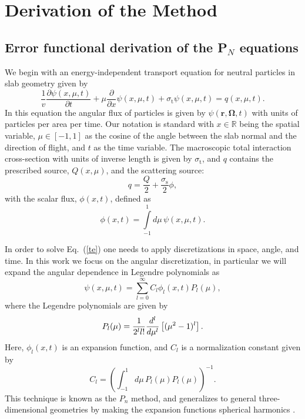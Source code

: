 \documentclass[review]{elsarticle}
\newcommand{\sigmat}{\sigma_\mathrm{t}}
\newcommand{\sigmas}{\sigma_\mathrm{s}}
\begin{document}
\section{Derivation of the Method}
\subsection{Error functional derivation of the P$_N$ equations}\label{s:derive}
We begin with an energy-independent transport equation for neutral particles in slab geometry given by \cite{glasstone} 
\begin{equation}\label{te}
\frac{1}{v}\frac{\partial\psi(x,\mu,t)}{\partial t}+\mu \frac{\partial}{\partial x} \psi(x,\mu,t)+\sigma_\mathrm{t}\psi(x,\mu,t)=q(x,\mu,t).
\end{equation}
In this equation the angular flux of particles is given by $\psi(\mathbf{r},\mathbf{\Omega},t)$ with units of particles per area per time. Our notation is standard with $x \in \mathbb{R}$ being the spatial variable, $\mu \in [-1,1]$ as the cosine of the angle between the slab normal and the direction of flight, and $t$ as the time variable. The macroscopic total interaction cross-section with units of inverse length is given by $\sigmat$, and $q$ contains the prescribed source, $Q(x,\mu)$, and the scattering source:
\begin{equation} \label{eq:scat_source}
q = \frac{Q}{2} + \frac{\sigmas}{2}\phi,
\end{equation}
with the scalar flux, $\phi(x,t)$, defined as
\begin{equation} \label{eq:scalarflux}
\phi(x, t)  = \int\limits_{-1}^{1} d\mu\, \psi(x,\mu,t).
\end{equation}


In order to solve Eq.~(\ref{te}) one needs to apply discretizations in space, angle, and time.  In this work we focus on the angular discretization, in particular we will expand the angular dependence in Legendre polynomials as 
\begin{equation} \label{eq:Pn_expansion}
\psi(x,\mu,t) = \sum_{l=0}^\infty C_l \phi_l(x,t) P_l(\mu),
\end{equation}
where the Legendre polynomials are given by
\begin{equation} \label{eq:legPoly}
P_l(\mu) = {1 \over 2^l l!} {d^l \over d\mu^l } \left[ (\mu^2 -1)^l \right].
\end{equation}
Here, 
$\phi_l(x,t)$ is an expansion function, and $C_l$ is a normalization constant given by
\[ C_l = \left(\int_{-1}^{1} d\mu\,P_l(\mu) P_l(\mu)\right)^{-1}.\]
This technique is known as the $P_n$ method, and generalizes to general three-dimensional geometries by making the expansion functions spherical harmonics \cite{glasstone}.
\end{document}
